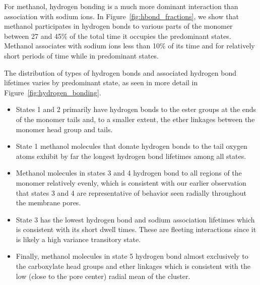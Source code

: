 \documentclass[journal=jpcbfk,manuscript=article]{achemso}
\begin{document}
  For methanol, hydrogen bonding is a much more dominant interaction than association
  with sodium ions. In Figure~\ref{fig:hbond_fractions}, we show that methanol 
  participates in hydrogen bonds to various parts of the monomer between 27 and
  45\% of the total time it occupies the predominant states. Methanol associates 
  with sodium ions less than 10\% of its time and for relatively short periods 
  of time while in predominant states. 

  The distribution of types of hydrogen bonds and associated hydrogen bond lifetimes
  varies by predominant state, as seen in more detail in Figure~\ref{fig:hydrogen_bonding}.
  \begin{itemize}
	\item States 1 and 2 primarily have hydrogen bonds to the ester groups at the ends
	of the monomer tails and, to a smaller extent, the ether linkages between the 
	monomer head group and tails. 
    \item State 1 methanol molecules that donate hydrogen bonds to the tail oxygen 
    atoms exhibit by far the longest hydrogen bond lifetimes among all states. 
    \item Methanol molecules in states 3 and 4 hydrogen bond to all regions of the
    monomer relatively evenly, which is consistent with our earlier observation that
    states 3 and 4 are representative of behavior seen radially throughout the membrane
    pores. 
    \item State 3 has the lowest hydrogen bond and sodium association lifetimes which
    is consistent with its short dwell times. These are fleeting interactions since it
    is likely a high variance transitory state. 
    \item Finally, methanol molecules in state 5 hydrogen bond almost exclusively 
    to the carboxylate head groups and ether linkages which is consistent with the 
    low (close to the pore center) radial mean of the cluster.
  \end{itemize}
\end{document}

